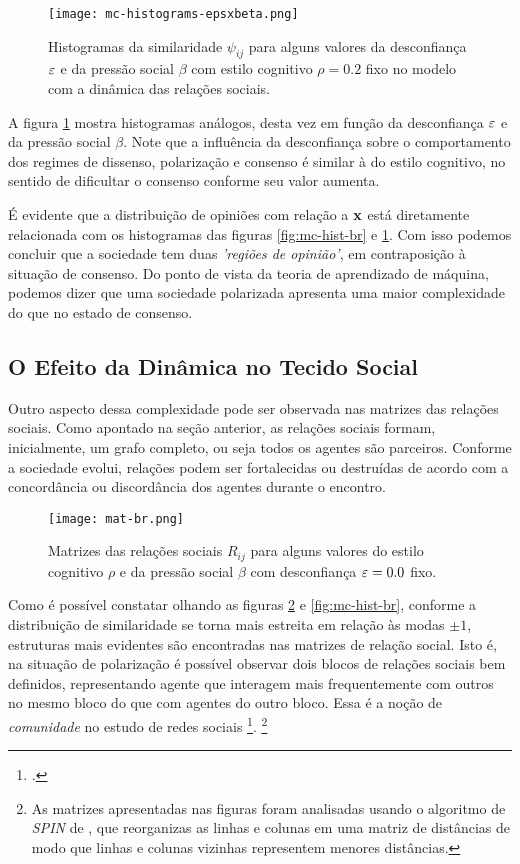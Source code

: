\begin{figure}[h!]\label{fig:mc-hist-be}
    \centering
    \texttt{[image: mc-histograms-epsxbeta.png]}
    \caption{Histogramas da similaridade $\psi_{ij}$ para alguns valores da desconfiança $\varepsilon$ e da pressão social $\beta$ com estilo cognitivo $\rho=0.2$ fixo no modelo com a dinâmica das relações sociais.}
\end{figure}

A figura \ref{fig:mc-hist-be} mostra histogramas análogos, desta vez em função da desconfiança $\varepsilon$ e da pressão social $\beta$.
Note que a influência da desconfiança sobre o comportamento dos regimes de dissenso, polarização e consenso é similar à do estilo cognitivo, no sentido de dificultar o consenso conforme seu valor aumenta.

É evidente que a distribuição de opiniões com relação a $\mathbf{x}$ está diretamente relacionada com os histogramas das figuras \ref{fig:mc-hist-br} e \ref{fig:mc-hist-be}.
Com isso podemos concluir que a sociedade tem duas \emph{'regiões de opinião'}, em contraposição à situação de consenso.
Do ponto de vista da teoria de aprendizado de máquina, podemos dizer que uma sociedade polarizada apresenta uma maior complexidade do que no estado de consenso.

\subsection{O Efeito da Dinâmica no Tecido Social}

Outro aspecto dessa complexidade pode ser observada nas matrizes das relações sociais.
Como apontado na seção anterior, as relações sociais formam, inicialmente, um grafo completo, ou seja todos os agentes são parceiros.
Conforme a sociedade evolui, relações podem ser fortalecidas ou destruídas de acordo com a concordância ou discordância dos agentes durante o encontro.

\begin{figure}[h!]\label{fig:mat-br}
    \centering
    \texttt{[image: mat-br.png]}
    \caption{Matrizes das relações sociais $R_{ij}$ para alguns valores do estilo cognitivo $\rho$ e da pressão social $\beta$ com desconfiança $\varepsilon=0.0$ fixo.}
\end{figure}

Como é possível constatar olhando as figuras \ref{fig:mat-br} e \ref{fig:mc-hist-br}, conforme a distribuição de similaridade se torna mais estreita em relação às modas $\pm1$, estruturas mais evidentes são encontradas nas matrizes de relação social.
Isto é, na situação de polarização é possível observar dois blocos de relações sociais bem definidos, representando agente que interagem mais frequentemente com outros no mesmo bloco do que com agentes do outro bloco.
Essa é a noção de \emph{comunidade} no estudo de redes sociais \footcite{NewmanBook,Reichardt2008}. \footnote{As matrizes apresentadas nas figuras foram analisadas usando o algoritmo de \emph{SPIN} de \parencite{Tsafrir2005}, que reorganizas as linhas e colunas em uma matriz de distâncias de modo que linhas e colunas vizinhas representem menores distâncias.}


